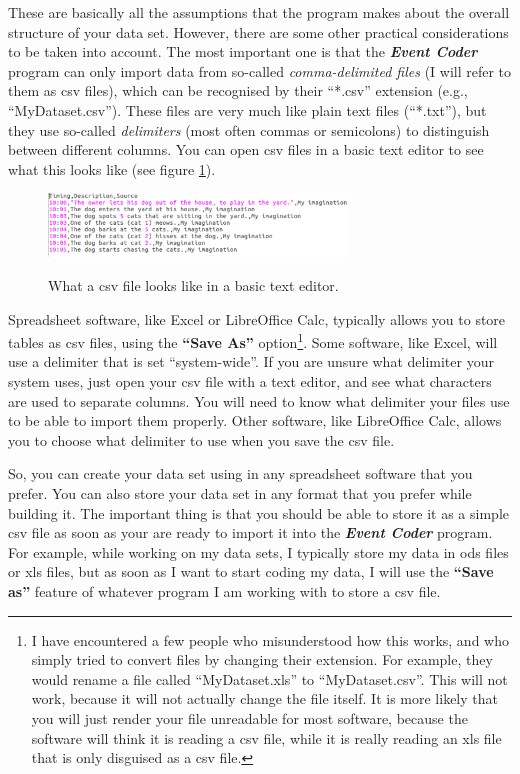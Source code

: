 \documentclass{memoir}
\begin{document}
These are basically all the assumptions that the program makes about the overall structure of your data set. However, there are some other practical considerations to be taken into account. The most important one is that the \textbf{\emph{Event Coder}} program can only import data from so-called \emph{comma-delimited files} (I will refer to them as csv files), which can be recognised by their ``*.csv'' extension (e.g., ``My\textunderscore Dataset.csv''). These files are very much like plain text files (``*.txt''), but they use so-called \emph{delimiters} (most often commas or semicolons) to distinguish between different columns. You can open csv files in a basic text editor to see what this looks like (see figure \ref{fig:csvfile}).

\begin{figure}[h!]
  \centering
  \caption{What a csv file looks like in a basic text editor.}
  \includegraphics[width=80mm]{Screenshot_19.pdf}
  \label{fig:csvfile}
\end{figure}

Spreadsheet software, like Excel or LibreOffice Calc, typically allows you to store tables as csv files, using the \textbf{``Save As''} option\footnote{I have encountered a few people who misunderstood how this works, and who simply tried to convert files by changing their extension. For example, they would rename a file called ``My\textunderscore Dataset.xls'' to ``My\textunderscore Dataset.csv''. This will not work, because it will not actually change the file itself. It is more likely that you will just render your file unreadable for most software, because the software will think it is reading a csv file, while it is really reading an xls file that is only disguised as a csv file.}. Some software, like Excel, will use a delimiter that is set ``system-wide''. If you are unsure what delimiter your system uses, just open your csv file with a text editor, and see what characters are used to separate columns. You will need to know what delimiter your files use to be able to import them properly. Other software, like LibreOffice Calc, allows you to choose what delimiter to use when you save the csv file.

So, you can create your data set using in any spreadsheet software that you prefer. You can also store your data set in any format that you prefer while building it. The important thing is that you should be able to store it as a simple csv file as soon as your are ready to import it into the \textbf{\emph{Event Coder}} program. For example, while working on my data sets, I typically store my data in ods files or xls files, but as soon as I want to start coding my data, I will use the \textbf{``Save as''} feature of whatever program I am working with to store a csv file.   
\end{document}
